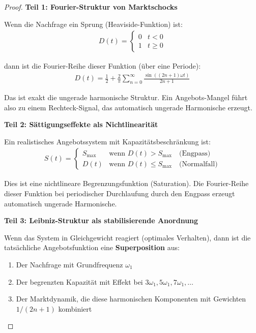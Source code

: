 \documentclass[a4paper, 12pt, twoside, openright]{report}
\theoremstyle{definition}
\theoremstyle{definition}
\begin{document}
\begin{proof}

\textbf{Teil 1: Fourier-Struktur von Marktschocks}

Wenn die Nachfrage ein Sprung (Heaviside-Funktion) ist:
\begin{align}
D(t) = \begin{cases} 0 & t < 0 \\ 1 & t \geq 0 \end{cases}
\end{align}

dann ist die Fourier-Reihe dieser Funktion (über eine Periode):
\begin{align}
D(t) = \frac{1}{2} + \frac{2}{\pi} \sum_{n=0}^{\infty} \frac{\sin((2n+1)\omega t)}{2n+1}
\end{align}

Das ist exakt die ungerade harmonische Struktur. Ein Angebots-Mangel führt also zu einem Rechteck-Signal, das automatisch ungerade Harmonische erzeugt.

\textbf{Teil 2: Sättigungseffekte als Nichtlinearität}

Ein realistisches Angebotssystem mit Kapazitätsbeschränkung ist:
\begin{align}
S(t) = \begin{cases} 
S_{\max} & \text{wenn } D(t) > S_{\max} \quad \text{(Engpass)} \\
D(t) & \text{wenn } D(t) \leq S_{\max} \quad \text{(Normalfall)}
\end{cases}
\end{align}

Dies ist eine nichtlineare Begrenzungsfunktion (Saturation). Die Fourier-Reihe dieser Funktion bei periodischer Durchlaufung durch den Engpass erzeugt automatisch ungerade Harmonische.

\textbf{Teil 3: Leibniz-Struktur als stabilisierende Anordnung}

Wenn das System in Gleichgewicht reagiert (optimales Verhalten), dann ist die tatsächliche Angebotsfunktion eine \textbf{Superposition} aus:
\begin{enumerate}
\item Der Nachfrage mit Grundfrequenz $\omega_1$
\item Der begrenzten Kapazität mit Effekt bei $3\omega_1, 5\omega_1, 7\omega_1, \ldots$
\item Der Marktdynamik, die diese harmonischen Komponenten mit Gewichten $1/(2n+1)$ kombiniert
\end{enumerate}


\end{proof}
\end{document}
